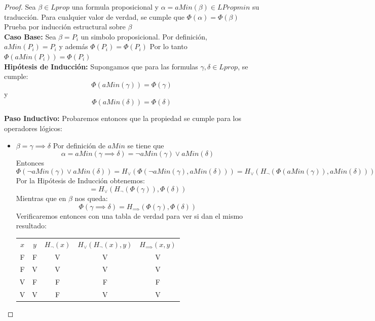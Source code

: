 \documentclass[12pt]{article}
\theoremstyle{remark}
\newcommand{\1}{\mathbbm{1}}
\begin{document}
    \begin{proof}
        Sea $\beta \in Lprop$ una formula proposicional y $\alpha = aMin(\beta) \in LPropmin$ su traducción. Para cualquier valor de verdad, se cumple que $\Phi(\alpha)=\Phi(\beta)$\\

        Prueba por inducción estructural sobre $\beta$\\

        \textbf{Caso Base:}    
        Sea $\beta = P_i$ un simbolo proposicional.
        Por definición, $aMin(P_i) = P_i$ y además $\Phi(P_i)=\Phi(P_i)$
        Por lo tanto $\Phi(aMin(P_i)) = \Phi(P_i)$\\

        \textbf{Hipótesis de Inducción:}
        Supongamos que para las formulas $\gamma, \delta \in Lprop$, se cumple: 
        \[
        \Phi(aMin(\gamma)) = \Phi(\gamma)
        \]
        y
        \[
        \Phi(aMin(\delta)) = \Phi(\delta) 
        \]
        
        \textbf{Paso Inductivo:}
        Probaremos entonces que la propiedad se cumple para los operadores lógicos:
        \begin{itemize}
            \item $\beta = \gamma \implies \delta$
            Por definición de $aMin$ se tiene que 
            \[
            \alpha = aMin(\gamma \implies \delta) = \neg aMin(\gamma) \lor aMin(\delta)
            \]
            Entonces
            \[
            \Phi(\neg aMin(\gamma) \lor aMin(\delta)) = H_\lor ( \Phi(\neg aMin(\gamma), aMin(\delta))) = H_\lor ( H_\neg(\Phi( aMin(\gamma)), aMin(\delta)))
            \]
            Por la Hipótesis de Inducción obtenemos:
            \[
            = H_\lor(H_\neg(\Phi(\gamma)), \Phi(\delta))
            \]
            Mientras que en $\beta$ nos queda:
            \[
            \Phi(\gamma \implies \delta) = H_{\implies} (\Phi(\gamma), \Phi(\delta)) 
            \]
            Verificaremos entonces con una tabla de verdad para ver si dan el mismo resultado:
            

                    \begin{center}
                        
                    
                    \begin{tabular}{ccccc}
                        $x$ & $y$ & $H_\neg (x)$ & $H_\lor (H_\neg (x), y)$ & $H_{\implies}(x,y) $ \\
                        F & F & V & V & V\\
                        F & V & V & V & V\\
                        V & F & F & F & F\\
                        V & V & F & V & V\\
                    \end{tabular}
\end{center}


\end{itemize}
\end{proof}
\end{document}
